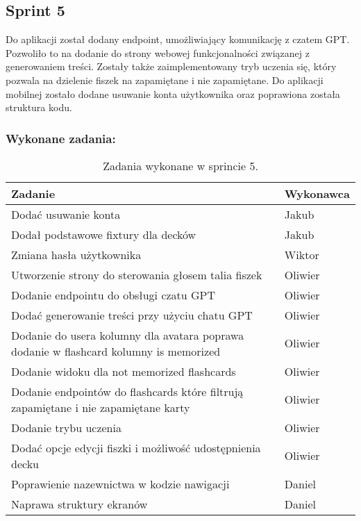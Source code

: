 \subsection{Sprint 5}

Do aplikacji został dodany endpoint, umożliwiający komunikację z czatem GPT. Pozwoliło to na dodanie do strony webowej funkcjonalności związanej z generowaniem treści. Zostały także zaimplementowany tryb uczenia się, który pozwala na dzielenie fiszek na zapamiętane i nie zapamiętane. Do aplikacji mobilnej zostało dodane usuwanie konta użytkownika oraz poprawiona została struktura kodu.

\subsubsection{Wykonane zadania:}

\begin{table}[H]
\centering
\begin{tabularx}{\textwidth}{|p{}|X|}
    \hline
    \textbf{Zadanie} & \textbf{Wykonawca} \\
    \hline
    [MOBILE] Dodać usuwanie konta & Jakub \\
    \hline
    [BACKEND] Dodał podstawowe fixtury dla decków & Jakub \\
    \hline
    [WEB] Zmiana hasła użytkownika & Wiktor \\
    \hline
    [WEB] Utworzenie strony do sterowania głosem talia fiszek & Oliwier \\
    \hline
    [BACKEND] Dodanie endpointu do obsługi czatu GPT & Oliwier \\
    \hline
    [WEB] Dodać generowanie treści przy użyciu chatu GPT & Oliwier \\
    \hline
    [BACKEND] Dodanie do usera kolumny dla avatara poprawa dodanie w flashcard kolumny is memorized & Oliwier \\
    \hline
    [WEB] Dodanie widoku dla not memorized flashcards & Oliwier \\
    \hline
    [BACKEND] Dodanie endpointów do flashcards które filtrują zapamiętane i nie zapamiętane karty & Oliwier \\
    \hline
    [WEB] Dodanie trybu uczenia & Oliwier \\
    \hline
    [WEB] Dodać opcje edycji fiszki i możliwość udostępnienia decku & Oliwier \\
    \hline
    [MOBILE] Poprawienie nazewnictwa w kodzie nawigacji & Daniel \\
    \hline
    [MOBILE] Naprawa struktury ekranów & Daniel \\
    \hline
\end{tabularx}
                \caption{Zadania wykonane w sprincie 5.}
\end{table}

